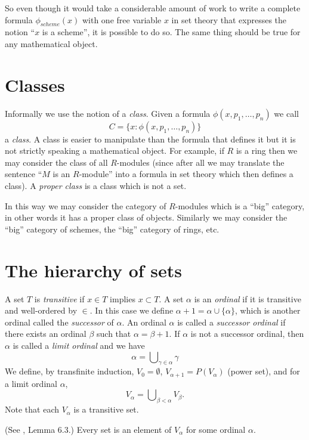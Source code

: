 \medskip\noindent
So even though it would take a considerable amount of work to write
a complete formula $\phi_{scheme}(x)$ with one free variable $x$ in set theory 
that expresses the notion ``$x$ is a scheme'', it is possible to do so.
The same thing should be true for any mathematical object.

\section{Classes}
\label{section-classes}

\noindent
Informally we use the notion of a {\it class}. Given a formula
$\phi(x,p_1,\ldots,p_n)$ we call
$$
C = \{x : \phi(x,p_1,\ldots,p_n)\}
$$
a {\it class}. A class is easier to manipulate than the formula
that defines it but it is not strictly speaking a mathematical
object. For example, if $R$ is a ring then we may
consider the class of all $R$-modules (since after all we
may translate the sentence ``$M$ is an $R$-module''
into a formula in set theory which then defines a class).
A {\it proper class} is a class which is not a set.

\medskip\noindent
In this way we may consider the category of $R$-modules
which is a ``big'' category, in other words it has a
proper class of objects. Similarly we may consider
the ``big'' category of schemes, the ``big'' category
of rings, etc.

\section{The hierarchy of sets}
\label{section-sets-hierarchy}

\noindent
A set $T$ is {\it transitive} if $x\in T$ implies $x\subset T$.
A set $\alpha$ is an {\it ordinal} if it is transitive and well-ordered
by $\in$. In this case we define $\alpha + 1 = \alpha \cup \{\alpha\}$,
which is another ordinal called the {\it successor} of $\alpha$.
An ordinal $\alpha$ is called a {\it successor ordinal} if 
there exists an ordinal $\beta$ such that $\alpha = \beta + 1$.
If $\alpha$ is not a successor ordinal, then $\alpha$ is called
a {\it limit ordinal} and we have
$$
\alpha 
=
\bigcup\nolimits_{\gamma \in \alpha} \gamma
$$
We define, by transfinite induction, $V_0 = \emptyset$,
$V_{\alpha + 1} = P(V_\alpha)$ (power set),
and for a limit ordinal $\alpha$,
$$
V_\alpha = \bigcup\nolimits_{\beta < \alpha} V_\beta.
$$
Note that each $V_\alpha$ is a transitive set.

\begin{lemma}
\label{axiom-regularity}
(See \cite{Jech}, Lemma 6.3.)
Every set is an element of $V_\alpha$ for some ordinal $\alpha$.
\end{lemma}

